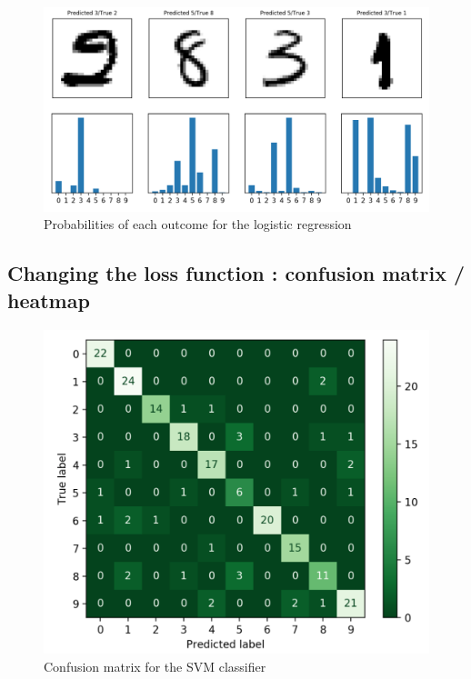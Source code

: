 \begin{figure}[h]
	\centering 
	\includegraphics[scale=0.35]{Pics/probas}
	\caption{Probabilities of each outcome for the logistic regression}
	\label{fig:probas}
\end{figure}



\newpage

\subsection{Changing the loss function : confusion matrix / heatmap}
\label{appendix:changingloss}
\begin{figure}[h]
	\centering 
	\includegraphics[scale=0.4]{Pics/confusion_matrixr}
	\caption{Confusion matrix for the SVM classifier}
	\label{fig:confusion}
\end{figure}


